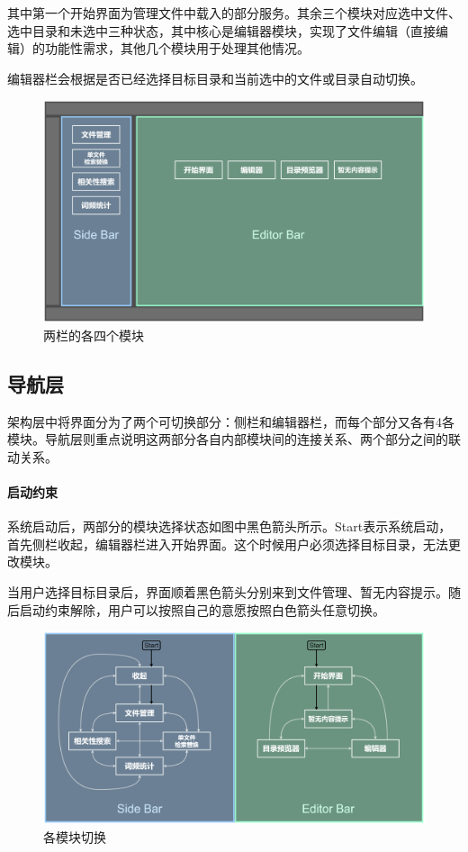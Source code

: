 \documentclass[scheme = chinese]{ctexart}
\begin{document}
其中第一个开始界面为管理文件中载入的部分服务。其余三个模块对应选中文件、选中目录和未选中三种状态，其中核心是编辑器模块，实现了文件编辑（直接编辑）的功能性需求，其他几个模块用于处理其他情况。

编辑器栏会根据是否已经选择目标目录和当前选中的文件或目录自动切换。

\begin{figure}[h]
    \centering
    \includegraphics[width=\textwidth]{images/dsacd-screenshot-modules.drawio.png}
    \caption{两栏的各四个模块}
\end{figure}

\subsection{导航层}

架构层中将界面分为了两个可切换部分：侧栏和编辑器栏，而每个部分又各有4各模块。导航层则重点说明这两部分各自内部模块间的连接关系、两个部分之间的联动关系。

\paragraph{启动约束}

系统启动后，两部分的模块选择状态如图中黑色箭头所示。Start表示系统启动，首先侧栏收起，编辑器栏进入开始界面。这个时候用户必须选择目标目录，无法更改模块。

当用户选择目标目录后，界面顺着黑色箭头分别来到文件管理、暂无内容提示。随后启动约束解除，用户可以按照自己的意愿按照白色箭头任意切换。

\clearpage

\begin{figure}[h]
    \centering
    \includegraphics[width=\textwidth]{images/dsacd-screenshot-switch.drawio.png}
    \caption{各模块切换}
\end{figure}
\end{document}
